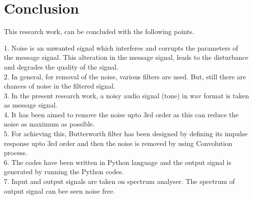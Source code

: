 \documentclass[journal,10pt,twocolumn]{article}
\begin{document}
\section{Conclusion}
\begin{flushleft}

This research work, can be concluded with the following points.\\
\vspace{0.1cm}


1. Noise is an unwanted signal which interferes and corrupts the parameters of the message signal. This alteration in the message signal, leads to the disturbance and degrades the quality of the signal. \\
\vspace{0.2cm}
2. In general, for removal of the noise, various filters are used. But, still there are chances of noise in the filtered signal. \\ 
\vspace{0.2cm}
3. In the present research work, a noisy audio signal (tone) in wav format is taken as message signal.\\
\vspace{0.2cm}
4. It has been aimed to remove the noise upto 3rd order as this can reduce the noise as maximum as possible. \\
\vspace{0.2cm}
5. For achieving this, Butterworth filter has been designed by defining its impulse response upto 3rd order and then the noise is removed by using Convolution process. \\
\vspace{0.2cm}
6. The codes have been written in Python language and the output signal is generated by running the Python codes. \\
\vspace{0.2cm}
7. Input and output signals are taken on spectrum analyser. The spectrum of output signal can bee seen noise free. 
\end{flushleft}
\end{document}
